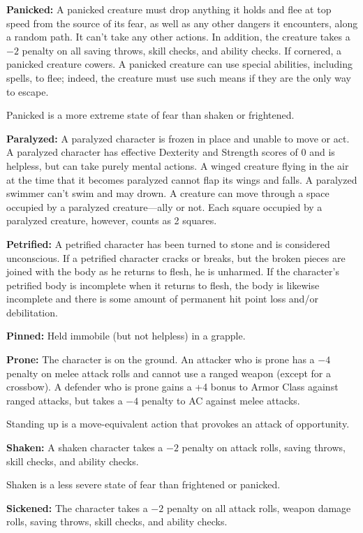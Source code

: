 \textbf{Panicked:} A panicked creature must drop anything it holds and flee at top speed from the source of its fear, as well as any other dangers it encounters, along a random path. It can't take any other actions. In addition, the creature takes a $-2$ penalty on all saving throws, skill checks, and ability checks. If cornered, a panicked creature cowers. A panicked creature can use special abilities, including spells, to flee; indeed, the creature must use such means if they are the only way to escape.

Panicked is a more extreme state of fear than shaken or frightened.

\textbf{Paralyzed:} A paralyzed character is frozen in place and unable to move or act. A paralyzed character has effective Dexterity and Strength scores of 0 and is helpless, but can take purely mental actions. A winged creature flying in the air at the time that it becomes paralyzed cannot flap its wings and falls. A paralyzed swimmer can't swim and may drown. A creature can move through a space occupied by a paralyzed creature---ally or not. Each square occupied by a paralyzed creature, however, counts as 2 squares.

\textbf{Petrified:} A petrified character has been turned to stone and is considered unconscious. If a petrified character cracks or breaks, but the broken pieces are joined with the body as he returns to flesh, he is unharmed. If the character's petrified body is incomplete when it returns to flesh, the body is likewise incomplete and there is some amount of permanent hit point loss and/or debilitation.

\textbf{Pinned:} Held immobile (but not helpless) in a grapple.

\textbf{Prone:} The character is on the ground. An attacker who is prone has a $-4$ penalty on melee attack rolls and cannot use a ranged weapon (except for a crossbow). A defender who is prone gains a +4 bonus to Armor Class against ranged attacks, but takes a $-4$ penalty to AC against melee attacks.

Standing up is a move-equivalent action that provokes an attack of opportunity.

\textbf{Shaken:} A shaken character takes a $-2$ penalty on attack rolls, saving throws, skill checks, and ability checks.

Shaken is a less severe state of fear than frightened or panicked.

\textbf{Sickened:} The character takes a $-2$ penalty on all attack rolls, weapon damage rolls, saving throws, skill checks, and ability checks.

